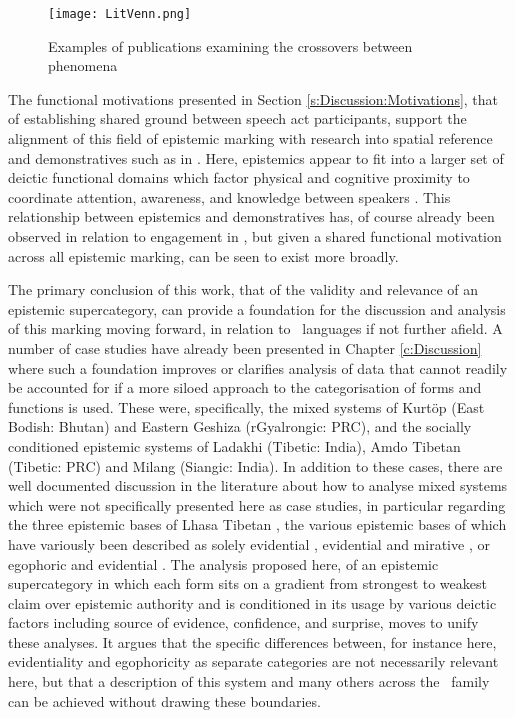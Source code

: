 \begin{figure}
    \centering
    \texttt{[image: LitVenn.png]}
    \caption{Examples of publications examining the crossovers between phenomena}
    \label{f:Conclusion:LitVenn}
\end{figure}

The functional motivations presented in Section \ref{s:Discussion:Motivations}, that of establishing shared ground between speech act participants, support the alignment of this field of epistemic marking with research into spatial reference and demonstratives such as in . Here, epistemics appear to fit into a larger set of deictic functional domains which factor physical and cognitive proximity to coordinate attention, awareness, and knowledge between speakers \cite{Peeters2016}. This relationship between epistemics and demonstratives has, of course already been observed in relation to engagement in , but given a shared functional motivation across all epistemic marking, can be seen to exist more broadly.

The primary conclusion of this work, that of the validity and relevance of an epistemic supercategory, can provide a foundation for the discussion and analysis of this marking moving forward, in relation to \lfam\ languages if not further afield. A number of case studies have already been presented in Chapter \ref{c:Discussion} where such a foundation improves or clarifies analysis of data that cannot readily be accounted for if a more siloed approach to the categorisation of forms and functions is used. These were, specifically, the mixed systems of Kurtöp (East Bodish: Bhutan) and Eastern Geshiza (rGyalrongic: PRC), and the socially conditioned epistemic systems of Ladakhi (Tibetic: India), Amdo Tibetan (Tibetic: PRC) and Milang (Siangic: India). In addition to these cases, there are well documented discussion in the literature about how to analyse mixed systems which were not specifically presented here as case studies, in particular regarding the three epistemic bases of Lhasa Tibetan \cite{DeLancey2017Tibetan}, the various epistemic bases of which have variously been described as solely evidential \cites{Garrett2001}{Gawne2017}, evidential and mirative \cites{DeLanceyMirativity1997}{DeLancey2012}, or egophoric and evidential \cites{Tournadre1992}{Widmer2017}. The analysis proposed here, of an epistemic supercategory in which each form sits on a gradient from strongest to weakest claim over epistemic authority and is conditioned in its usage by various deictic factors including source of evidence, confidence, and surprise, moves to unify these analyses. It argues that the specific differences between, for instance here, evidentiality and egophoricity as separate categories are not necessarily relevant here, but that a description of this system and many others across the \lfam\ family can be achieved without drawing these boundaries.

